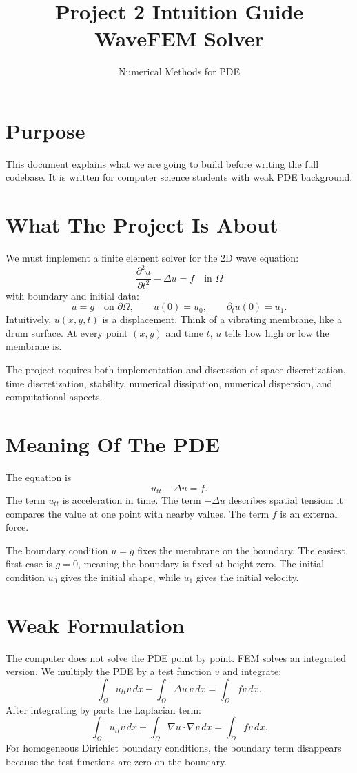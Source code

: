 \documentclass[11pt,a4paper]{article}
\title{Project 2 Intuition Guide\\WaveFEM Solver}
\author{Numerical Methods for PDE}
\date{}
\begin{document}
\maketitle

\section*{Purpose}
This document explains what we are going to build before writing the full codebase.
It is written for computer science students with weak PDE background.

\section{What The Project Is About}
We must implement a finite element solver for the 2D wave equation:
\[
\frac{\partial^2 u}{\partial t^2} - \Delta u = f \quad \text{in } \Omega
\]
with boundary and initial data:
\[
u = g \quad \text{on } \partial\Omega,
\qquad
u(0) = u_0,
\qquad
\partial_t u(0) = u_1.
\]
Intuitively, \(u(x,y,t)\) is a displacement. Think of a vibrating membrane, like a drum surface.
At every point \((x,y)\) and time \(t\), \(u\) tells how high or low the membrane is.

The project requires both implementation and discussion of space discretization, time discretization,
stability, numerical dissipation, numerical dispersion, and computational aspects.

\section{Meaning Of The PDE}
The equation is
\[
u_{tt} - \Delta u = f.
\]
The term \(u_{tt}\) is acceleration in time. The term \(-\Delta u\) describes spatial tension:
it compares the value at one point with nearby values. The term \(f\) is an external force.

The boundary condition \(u=g\) fixes the membrane on the boundary. The easiest first case is
\(g=0\), meaning the boundary is fixed at height zero. The initial condition \(u_0\) gives the
initial shape, while \(u_1\) gives the initial velocity.

\section{Weak Formulation}
The computer does not solve the PDE point by point. FEM solves an integrated version.
We multiply the PDE by a test function \(v\) and integrate:
\[
\int_\Omega u_{tt} v\,dx - \int_\Omega \Delta u\,v\,dx
=
\int_\Omega f v\,dx.
\]
After integrating by parts the Laplacian term:
\[
\int_\Omega u_{tt} v\,dx
+
\int_\Omega \nabla u \cdot \nabla v\,dx
=
\int_\Omega f v\,dx.
\]
For homogeneous Dirichlet boundary conditions, the boundary term disappears because the test
functions are zero on the boundary.
\end{document}
